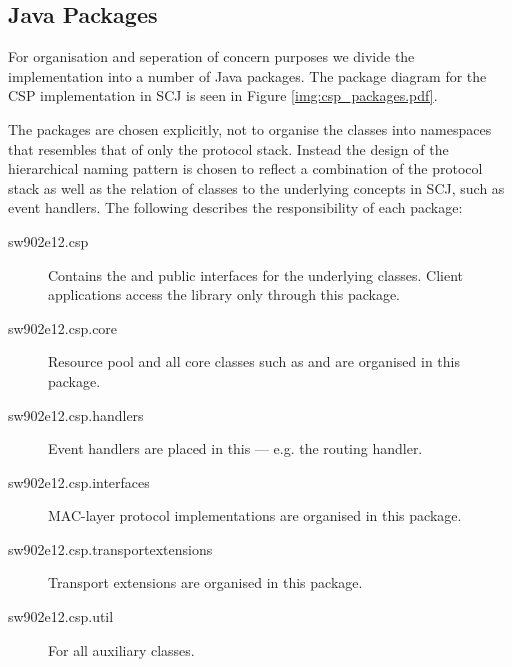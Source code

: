\subsection{Java Packages}
For organisation and seperation of concern purposes we divide the implementation into a number of Java packages. The package diagram for the CSP implementation in SCJ is seen in Figure \ref{img:csp_packages.pdf}.

The packages are chosen explicitly, not to organise the classes into namespaces that resembles that of only the protocol stack. Instead the design of the hierarchical naming pattern is chosen to reflect a combination of the protocol stack as well as the relation of classes to the underlying concepts in SCJ, such as event handlers. The following describes the responsibility of each package:
\begin{description}
	\item[sw902e12.csp] Contains the  and public interfaces for the underlying classes. Client applications access the library only through this package.
	\item[sw902e12.csp.core] Resource pool and all core classes such as  and  are organised in this package.
	\item[sw902e12.csp.handlers] Event handlers are placed in this --- e.g. the routing handler.
	\item[sw902e12.csp.interfaces] MAC-layer protocol implementations are organised in this package.
	\item[sw902e12.csp.transportextensions] Transport extensions are organised in this package.
	\item[sw902e12.csp.util] For all auxiliary classes.
\end{description}